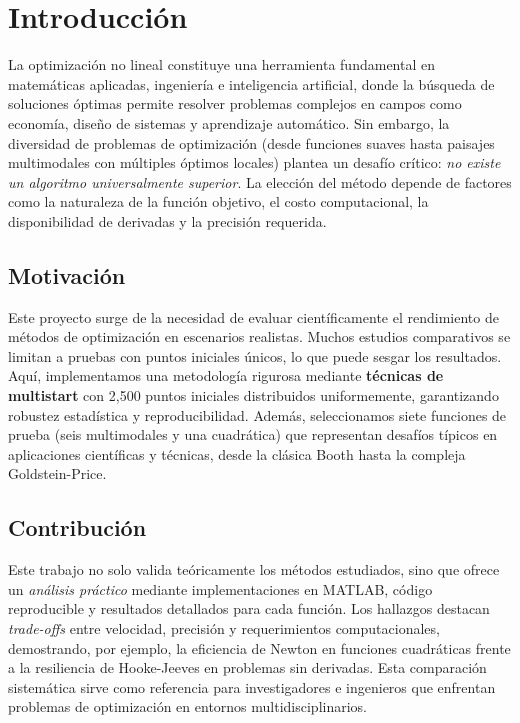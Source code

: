\chapter{Introducción}

La optimización no lineal constituye una herramienta fundamental en matemáticas aplicadas, ingeniería e inteligencia artificial, donde la búsqueda de soluciones óptimas permite resolver problemas complejos en campos como economía, diseño de sistemas y aprendizaje automático. Sin embargo, la diversidad de problemas de optimización (desde funciones suaves hasta paisajes multimodales con múltiples óptimos locales) plantea un desafío crítico: \emph{no existe un algoritmo universalmente superior}. La elección del método depende de factores como la naturaleza de la función objetivo, el costo computacional, la disponibilidad de derivadas y la precisión requerida.

\section*{Motivación}

Este proyecto surge de la necesidad de evaluar científicamente el rendimiento de métodos de optimización en escenarios realistas. Muchos estudios comparativos se limitan a pruebas con puntos iniciales únicos, lo que puede sesgar los resultados. Aquí, implementamos una metodología rigurosa mediante \textbf{técnicas de multistart} con 2,500 puntos iniciales distribuidos uniformemente, garantizando robustez estadística y reproducibilidad. Además, seleccionamos siete funciones de prueba (seis multimodales y una cuadrática) que representan desafíos típicos en aplicaciones científicas y técnicas, desde la clásica Booth hasta la compleja Goldstein-Price.

\section*{Contribución}

Este trabajo no solo valida teóricamente los métodos estudiados, sino que ofrece un \emph{análisis práctico} mediante implementaciones en MATLAB, código reproducible y resultados detallados para cada función. Los hallazgos destacan \emph{trade-offs} entre velocidad, precisión y requerimientos computacionales, demostrando, por ejemplo, la eficiencia de Newton en funciones cuadráticas frente a la resiliencia de Hooke-Jeeves en problemas sin derivadas. Esta comparación sistemática sirve como referencia para investigadores e ingenieros que enfrentan problemas de optimización en entornos multidisciplinarios.